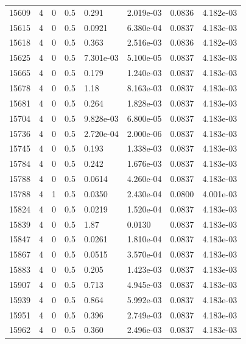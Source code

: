 \documentclass[preview]{standalone}
\begin{document}
{{{{{{{{{{{{{{{{{\begin{tabular}{L{1.2cm}C{1.2cm} C{0.3cm}C{0.5cm} C{1.4cm}C{1.4cm} C{1.4cm}C{1.4cm}}
  15609  &     4  & 0     & 0.5 &  0.291  & 2.019e-03  & 0.0836 &  4.182e-03   \\ 
  15615  &     4  & 0     & 0.5 &  0.0921  & 6.380e-04  & 0.0837 &  4.183e-03   \\ 
  15618  &     4  & 0     & 0.5 &  0.363  & 2.516e-03  & 0.0836 &  4.182e-03   \\ 
  15625  &     4  & 0     & 0.5 &  7.301e-03  & 5.100e-05  & 0.0837 &  4.183e-03   \\ 
  15665  &     4  & 0     & 0.5 &  0.179  & 1.240e-03  & 0.0837 &  4.183e-03   \\ 
  15678  &     4  & 0     & 0.5 &  1.18  & 8.163e-03  & 0.0837 &  4.183e-03   \\ 
  15681  &     4  & 0     & 0.5 &  0.264  & 1.828e-03  & 0.0837 &  4.183e-03   \\ 
  15704  &     4  & 0     & 0.5 &  9.828e-03  & 6.800e-05  & 0.0837 &  4.183e-03   \\ 
  15736  &     4  & 0     & 0.5 &  2.720e-04  & 2.000e-06  & 0.0837 &  4.183e-03   \\ 
  15745  &     4  & 0     & 0.5 &  0.193  & 1.338e-03  & 0.0837 &  4.183e-03   \\ 
  15784  &     4  & 0     & 0.5 &  0.242  & 1.676e-03  & 0.0837 &  4.183e-03   \\ 
  15788  &     4  & 0     & 0.5 &  0.0614  & 4.260e-04  & 0.0837 &  4.183e-03   \\ 
  15788  &     4  & 1     & 0.5 &  0.0350  & 2.430e-04  & 0.0800 &  4.001e-03   \\ 
  15824  &     4  & 0     & 0.5 &  0.0219  & 1.520e-04  & 0.0837 &  4.183e-03   \\ 
  15839  &     4  & 0     & 0.5 &  1.87  & 0.0130  & 0.0837 &  4.183e-03   \\ 
  15847  &     4  & 0     & 0.5 &  0.0261  & 1.810e-04  & 0.0837 &  4.183e-03   \\ 
  15867  &     4  & 0     & 0.5 &  0.0515  & 3.570e-04  & 0.0837 &  4.183e-03   \\ 
  15883  &     4  & 0     & 0.5 &  0.205  & 1.423e-03  & 0.0837 &  4.183e-03   \\ 
  15907  &     4  & 0     & 0.5 &  0.713  & 4.945e-03  & 0.0837 &  4.183e-03   \\ 
  15939  &     4  & 0     & 0.5 &  0.864  & 5.992e-03  & 0.0837 &  4.183e-03   \\ 
  15951  &     4  & 0     & 0.5 &  0.396  & 2.749e-03  & 0.0837 &  4.183e-03   \\ 
  15962  &     4  & 0     & 0.5 &  0.360  & 2.496e-03  & 0.0837 &  4.183e-03   \\ 

\end{tabular}}}}}}}}}}}}}}}}}}
\end{document}
